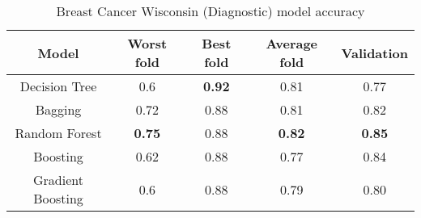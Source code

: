\begin{table}[htbp]
    \centering
    \begin{tabular}{c c c c c}
    \toprule
    Model               & Worst fold     & Best fold     & Average fold  & Validation    \\
    \midrule
    Decision Tree       &  0.6           & \textbf{0.92} & 0.81          & 0.77          \\
    Bagging             &  0.72          & 0.88          & 0.81          & 0.82          \\
    Random Forest       &  \textbf{0.75} & 0.88          & \textbf{0.82} & \textbf{0.85} \\
    Boosting            &  0.62          & 0.88          & 0.77          & 0.84          \\
    Gradient Boosting   &  0.6           & 0.88          & 0.79          & 0.80          \\
    \bottomrule
    \end{tabular}
    \caption{Breast Cancer Wisconsin (Diagnostic) model accuracy}
\end{table}